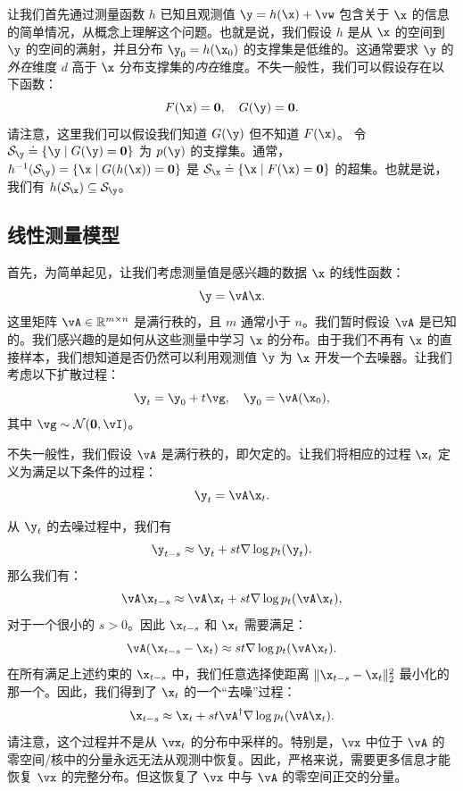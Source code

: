 \documentclass[../../book-main_zh.tex]{subfiles}
\begin{document}
让我们首先通过测量函数 $h$ 已知且观测值 $\y = h(\x) + \vw$ 包含关于 $\x$ 的信息的简单情况，从概念上理解这个问题。也就是说，我们假设 $h$ 是从 $\x$ 的空间到 $\y$ 的空间的满射，并且分布 $\y_0 = h(\x_0)$ 的支撑集是低维的。这通常要求 $\y$ 的\textit{外在}维度 $d$ 高于 $\x$ 分布支撑集的\textit{内在}维度。不失一般性，我们可以假设存在以下函数：
\begin{equation}
    F(\x) = \boldsymbol{0},\quad     G(\y) = \boldsymbol{0}.
\end{equation}
请注意，这里我们可以假设我们知道 $G(\y)$ 但不知道 $F(\x)$。
令 $\mathcal{S}_{\y} \doteq \{\y \mid G(\y) = \boldsymbol{0}\}$ 为 $p(\y)$ 的支撑集。通常，$h^{-1}(\mathcal{S}_{\y}) = \{\x
\mid G(h(\x)) = \boldsymbol{0}\}$ 是 $\mathcal{S}_{\x}
\doteq \{\x \mid F(\x) = \boldsymbol{0}\}$ 的超集。也就是说，我们有 $h(\mathcal{S}_{\x}) \subseteq \mathcal{S}_{\y}$。

\subsection{线性测量模型}
首先，为简单起见，让我们考虑测量值是感兴趣的数据 $\x$ 的线性函数：
\begin{equation}
    \y = \vA\x.
\end{equation}
这里矩阵 $\vA \in \mathbb{R}^{m\times n}$ 是满行秩的，且 $m$ 通常小于 $n$。我们暂时假设 $\vA$ 是已知的。我们感兴趣的是如何从这些测量中学习 $\x$ 的分布。由于我们不再有 $\x$ 的直接样本，我们想知道是否仍然可以利用观测值 $\y$ 为 $\x$ 开发一个去噪器。让我们考虑以下扩散过程：
\begin{equation}
    \y_t = \y_0 + t \vg, \quad \y_0 = \vA(\x_0),
\end{equation}
其中 $\vg \sim \mathcal{N}(\boldsymbol{0}, \vI)$。

不失一般性，我们假设 $\vA$ 是满行秩的，即欠定的。让我们将相应的过程 $\x_t$ 定义为满足以下条件的过程：
\begin{equation}
    \y_t = \vA \x_t.
\end{equation}

从 $\y_t$ 的去噪过程中，我们有
\begin{equation}
    \y_{t-s} \approx  \y_t + st \nabla \log p_t(\y_t).
\end{equation}
那么我们有：
\begin{equation}
    \vA\x_{t-s} \approx   \vA\x_t + st \nabla \log p_t(\vA \x_t),
\end{equation}
对于一个很小的 $s >0$。因此 $\x_{t-s}$ 和 $\x_t$ 需要满足：
\begin{equation}
    \vA(\x_{t-s} - \x_t) \approx st \nabla \log p_t(\vA\x_t).
\end{equation}
在所有满足上述约束的 $\x_{t-s}$ 中，我们任意选择使距离 $\|\x_{t-s} -
\x_t\|_2^2$ 最小化的那一个。因此，我们得到了 $\x_t$ 的一个“去噪”过程：
\begin{equation}
    \x_{t-s}  \approx \x_t + st\vA^\dagger \nabla \log p_t(\vA\x_t).
    \label{eqn:denoising-projection}
\end{equation}
请注意，这个过程并不是从 $\vx_t$ 的分布中采样的。特别是，$\vx$ 中位于 $\vA$ 的零空间/核中的分量永远无法从观测中恢复。因此，严格来说，需要更多信息才能恢复 $\vx$ 的完整分布。但这恢复了 $\vx$ 中与 $\vA$ 的零空间正交的分量。
\end{document}
